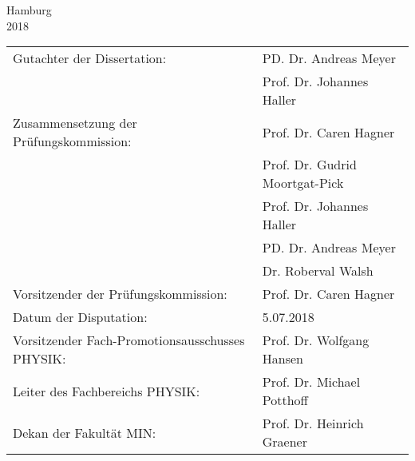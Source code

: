 {\begin{titlepage}
\begin{center}
{       Hamburg\\
       2018\\
      } 
   \end{center}
      \newpage
      \thispagestyle{empty}
      \null
      \vfill
      \hspace{-0.5cm}
      \begin{tabular}{ll}
        Gutachter der Dissertation: & PD. Dr. Andreas Meyer\\
                                       & Prof. Dr. Johannes Haller\\[3mm]
        Zusammensetzung der Pr\"{u}fungskommission: 
        & Prof. Dr. Caren Hagner\\
        & Prof. Dr. Gudrid Moortgat-Pick \\
        & Prof. Dr. Johannes Haller\\
        & PD. Dr. Andreas Meyer\\
        & Dr. Roberval Walsh\\[3mm]
        Vorsitzender der Pr\"{u}fungskommission: & Prof. Dr. Caren Hagner\\[3mm]
        Datum der Disputation: & 5.07.2018\\[3mm]
        Vorsitzender Fach-Promotionsausschusses PHYSIK: & Prof. Dr. Wolfgang Hansen\\[3mm]
        Leiter des Fachbereichs PHYSIK: & Prof. Dr. Michael Potthoff\\[3mm]
        Dekan der Fakult\"{a}t MIN: & Prof. Dr. Heinrich Graener\\     
      \end{tabular}

 \end{titlepage}
 }
